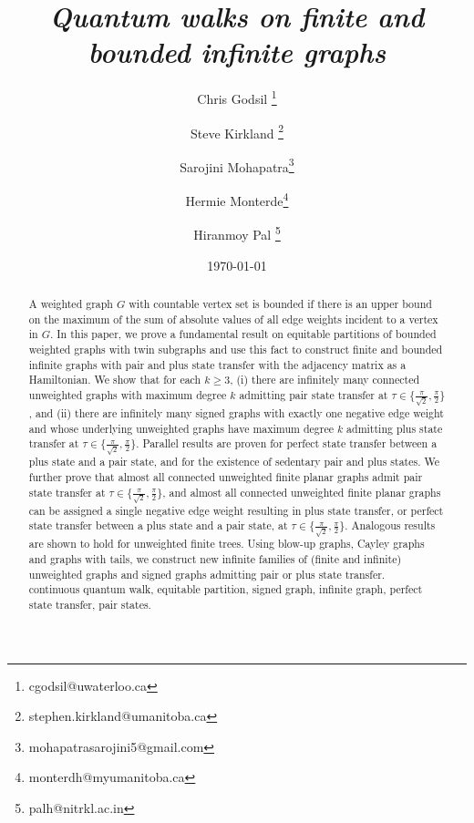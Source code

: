 \documentclass[12pt,a4paper]{article}
\title{\it Quantum walks on finite and bounded infinite graphs}%
\author[1]{Chris Godsil \thanks{cgodsil@uwaterloo.ca}}
\author[2]{Steve Kirkland \thanks{stephen.kirkland@umanitoba.ca}}
\author[3]{Sarojini Mohapatra\thanks{mohapatrasarojini5@gmail.com}}
\author[2]{Hermie Monterde\thanks{monterdh@myumanitoba.ca}}
\author[3]{Hiranmoy Pal \thanks{palh@nitrkl.ac.in}}
\affil[1]{Department of Combinatorics \& Optimization, University of Waterloo, Waterloo, Ontario, Canada}%
\affil[2]{Department of Mathematics, University of Manitoba, Winnipeg, MB, Canada R3T 2N2}
\affil[3]{National Institute of Technology Rourkela, India-769008  }%
\date{\today}
\renewcommand{\baselinestretch}{1.5}
\begin{document}
	
	\maketitle
	
	
	
\begin{abstract}
A weighted graph $G$ with countable vertex set is bounded if there is an upper bound on the maximum of the sum of absolute values of all edge weights incident to a vertex in $G$. In this paper, we prove a fundamental result on equitable partitions of bounded weighted graphs with twin subgraphs and use this fact to construct finite and bounded infinite graphs with pair and plus state transfer with the adjacency matrix as a Hamiltonian. We show that for each $k \ge 3$, (i) there are infinitely many connected unweighted graphs with maximum degree $k$ admitting pair state transfer at $\tau\in\{\frac{\pi}{\sqrt{2}},\frac{\pi}{2}\}$, and (ii) there are infinitely many signed graphs with exactly one negative edge weight and whose underlying unweighted graphs have maximum degree $k$ admitting plus state transfer at $\tau\in\{\frac{\pi}{\sqrt{2}},\frac{\pi}{2}\}$. Parallel results are proven for perfect state transfer between a plus state and a pair state, and for the existence of sedentary pair and plus states. We further prove that almost all connected unweighted finite planar graphs admit pair state transfer at $\tau\in\{\frac{\pi}{\sqrt{2}},\frac{\pi}{2}\}$, and almost all connected unweighted finite planar graphs can be assigned a single negative edge weight resulting in plus state transfer, or perfect state transfer between a plus state and a pair state, at $\tau\in\{\frac{\pi}{\sqrt{2}},\frac{\pi}{2}\}$. Analogous results are shown to hold for unweighted finite trees. Using blow-up graphs, Cayley graphs and graphs with tails, we construct new infinite families of (finite and infinite) unweighted graphs and signed graphs admitting pair or plus state transfer.\\

 continuous quantum walk, equitable partition, signed graph, infinite graph, perfect state transfer, pair states.\\
\end{abstract}


	
\end{document}
